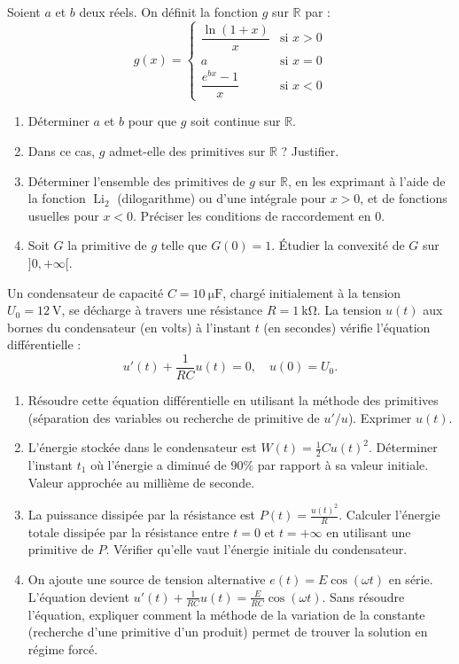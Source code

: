 \documentclass[11pt]{article}
\begin{document}
\begin{exercice}
Soient $a$ et $b$ deux réels. On définit la fonction $g$ sur $\mathbb{R}$ par :
\[
g(x) = \begin{cases}
\dfrac{\ln(1+x)}{x} & \text{si } x > 0 \\[1em]
a & \text{si } x = 0 \\[0.5em]
\dfrac{e^{bx}-1}{x} & \text{si } x < 0
\end{cases}
\]
\begin{enumerate}
    \item Déterminer $a$ et $b$ pour que $g$ soit continue sur $\mathbb{R}$.
    \item Dans ce cas, $g$ admet-elle des primitives sur $\mathbb{R}$ ? Justifier.
    \item Déterminer l'ensemble des primitives de $g$ sur $\mathbb{R}$, en les exprimant à l'aide de la fonction $\operatorname{Li}_2$ (dilogarithme) ou d'une intégrale pour $x>0$, et de fonctions usuelles pour $x<0$. Préciser les conditions de raccordement en $0$.
    \item Soit $G$ la primitive de $g$ telle que $G(0)=1$. Étudier la convexité de $G$ sur $]0, +\infty[$.
\end{enumerate}
\end{exercice}

\begin{exercice}
Un condensateur de capacité $C = \SI{10}{\micro\farad}$, chargé initialement à la tension $U_0 = \SI{12}{\volt}$, se décharge à travers une résistance $R = \SI{1}{\kilo\ohm}$. La tension $u(t)$ aux bornes du condensateur (en volts) à l'instant $t$ (en secondes) vérifie l'équation différentielle :
\[
u'(t) + \frac{1}{RC}u(t) = 0, \quad u(0) = U_0.
\]
\begin{enumerate}
    \item Résoudre cette équation différentielle en utilisant la méthode des primitives (séparation des variables ou recherche de primitive de $u'/u$). Exprimer $u(t)$.
    \item L'énergie stockée dans le condensateur est $W(t) = \frac{1}{2}C u(t)^2$. Déterminer l'instant $t_1$ où l'énergie a diminué de $90\%$ par rapport à sa valeur initiale. Valeur approchée au millième de seconde.
    \item La puissance dissipée par la résistance est $P(t) = \frac{u(t)^2}{R}$. Calculer l'énergie totale dissipée par la résistance entre $t=0$ et $t=+\infty$ en utilisant une primitive de $P$. Vérifier qu'elle vaut l'énergie initiale du condensateur.
    \item On ajoute une source de tension alternative $e(t) = E \cos(\omega t)$ en série. L'équation devient $u'(t) + \frac{1}{RC}u(t) = \frac{E}{RC}\cos(\omega t)$. Sans résoudre l'équation, expliquer comment la méthode de la variation de la constante (recherche d'une primitive d'un produit) permet de trouver la solution en régime forcé.
\end{enumerate}
\end{exercice}
\end{document}
